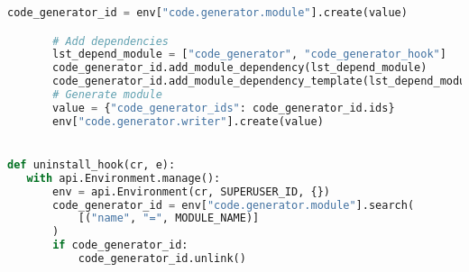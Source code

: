 \begin{lstlisting}[language=Python, upquote=true]
       code_generator_id = env["code.generator.module"].create(value)

       # Add dependencies
       lst_depend_module = ["code_generator", "code_generator_hook"]
       code_generator_id.add_module_dependency(lst_depend_module)
       code_generator_id.add_module_dependency_template(lst_depend_module)
       # Generate module
       value = {"code_generator_ids": code_generator_id.ids}
       env["code.generator.writer"].create(value)


def uninstall_hook(cr, e):
   with api.Environment.manage():
       env = api.Environment(cr, SUPERUSER_ID, {})
       code_generator_id = env["code.generator.module"].search(
           [("name", "=", MODULE_NAME)]
       )
       if code_generator_id:
           code_generator_id.unlink()
\end{lstlisting}